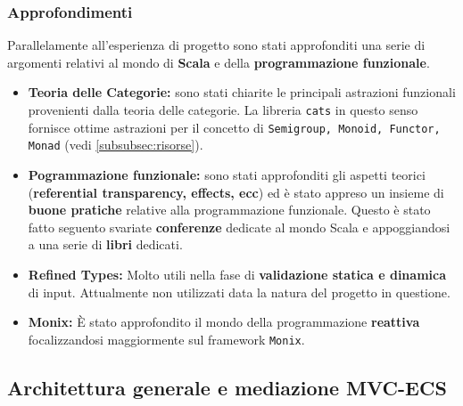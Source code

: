\subsubsection{Approfondimenti}
Parallelamente all'esperienza di progetto sono stati approfonditi una serie di argomenti relativi al mondo di \textbf{Scala} e della \textbf{programmazione funzionale}. 
\begin{itemize}
	\item{\textbf{Teoria delle Categorie:}} sono stati chiarite le principali astrazioni funzionali provenienti dalla teoria delle categorie. La libreria \texttt{cats} in questo senso fornisce ottime astrazioni per il concetto di \texttt{Semigroup, Monoid, Functor, Monad} (vedi \ref{subsubsec:risorse}).
	\item{\textbf{Pogrammazione funzionale:}} sono stati approfonditi gli aspetti teorici (\textbf{referential transparency, effects, ecc}) ed è stato appreso un insieme di \textbf{buone pratiche} relative alla programmazione funzionale. Questo è stato fatto seguento svariate \textbf{conferenze} dedicate al mondo Scala e appoggiandosi a una serie di \textbf{libri} dedicati. 
	\item{\textbf{Refined Types:}} Molto utili nella fase di \textbf{validazione statica e dinamica} di input. Attualmente non utilizzati data la natura del progetto in questione.
	\item{\textbf{Monix:}} È stato approfondito il mondo della programmazione \textbf{reattiva} focalizzandosi maggiormente sul framework \texttt{Monix}.
\end{itemize}

\subsection{Architettura generale e mediazione MVC-ECS}
\label{subsec:arc_mediator}
